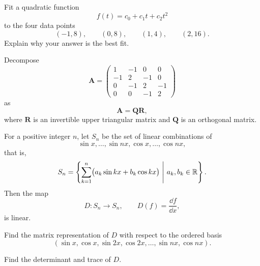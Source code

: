 \documentclass[11pt,oneside]{article}
\begin{document}
\begin{problem}
Fit a quadratic function
\[
f(t)=c_0+c_1t+c_2t^2
\]
to the four data points
\[
(-1,8),\qquad(0,8),\qquad(1,4),\qquad(2,16).
\]
Explain why your answer is the best fit.
\end{problem}

\begin{problem}
Decompose
\[
\mathbf A=
\begin{pmatrix}
1&-1&0&0\\
-1&2&-1&0\\
0&-1&2&-1\\
0&0&-1&2
\end{pmatrix}
\]
as
\[
\mathbf A=\mathbf Q\mathbf R,
\]
where $\mathbf R$ is an invertible upper triangular matrix and $\mathbf Q$ is an orthogonal matrix.
\end{problem}

\begin{problem}
For a positive integer $n$, let $S_n$ be the set of linear combinations of
\[
\sin x,\dots,\sin nx,\cos x,\dots,\cos nx,
\]
that is,
\[
S_n=\left\{\sum_{k=1}^n\bigl(a_k\sin kx+b_k\cos kx\bigr)\ \middle|\ a_k,b_k\in\mathbb{R}\right\}.
\]
Then the map
\[
D\colon S_n\to S_n,
\qquad
D(f)=\frac{\dd f}{\dd x},
\]
is linear.
\begin{problemsubparts}
\item Find the matrix representation of $D$ with respect to the ordered basis
\[
(\sin x,\cos x,\sin 2x,\cos 2x,\dots,\sin nx,\cos nx).
\]
\item Find the determinant and trace of $D$.
\end{problemsubparts}
\end{problem}
\end{document}

